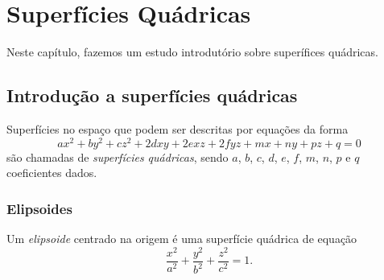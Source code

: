 
\chapter{Superfícies Quádricas}\label{cap_superquad}
\thispagestyle{fancy}

Neste capítulo, fazemos um estudo introdutório sobre superífices quádricas.

\section{Introdução a superfícies quádricas}\label{cap_superquad_sec_intro}

Superfícies no espaço que podem ser descritas por equações da forma
\begin{equation}
  ax^2 + by^2 + cz^2 + 2dxy + 2exz + 2fyz + mx + ny + pz + q = 0
\end{equation}
são chamadas de \emph{superfícies quádricas}, sendo $a$, $b$, $c$, $d$, $e$, $f$, $m$, $n$, $p$ e $q$ coeficientes dados.

\subsection{Elipsoides}

Um \emph{elipsoide} centrado na origem é uma superfície quádrica de equação
\begin{equation}
  \frac{x^2}{a^2} + \frac{y^2}{b^2} + \frac{z^2}{c^2} = 1.
\end{equation}

